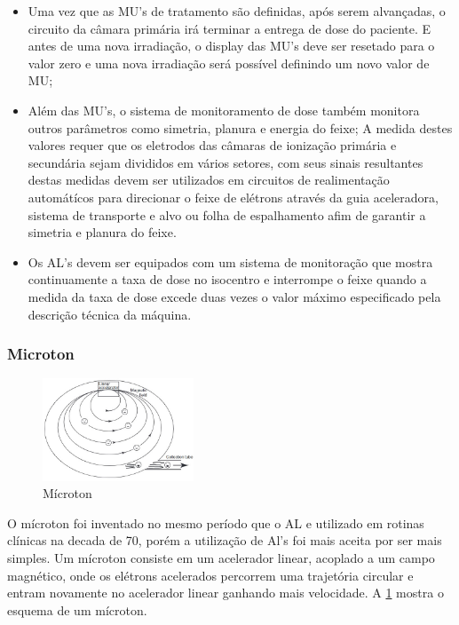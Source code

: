 \documentclass[11pt,a4paper]{article}
\begin{document}
\begin{itemize}
		\item Uma vez que as MU's de tratamento são definidas, após serem alvançadas, o circuito da câmara primária irá terminar a entrega de dose do paciente. E antes de uma nova irradiação, o display das MU's deve ser resetado para o valor zero e uma nova irradiação será possível definindo um novo valor de MU;
		
		\item Além das MU's, o sistema de monitoramento de dose também monitora outros parâmetros como simetria, planura e energia do feixe; A medida destes valores requer que os eletrodos das câmaras de ionização primária e secundária sejam divididos em vários setores, com seus sinais resultantes destas medidas devem ser utilizados em circuitos de realimentação automátícos para direcionar o feixe de elétrons através da guia aceleradora, sistema de transporte e alvo ou folha de espalhamento afim de garantir a simetria e planura do feixe.
		
		\item Os AL's devem ser equipados com um sistema de monitoração que mostra continuamente a taxa de dose no isocentro e interrompe o feixe quando a medida da taxa de dose excede duas vezes o valor máximo especificado pela descrição técnica da máquina.
	\end{itemize}
            
\subsubsection*{Microton}

                \begin{figure}
                    \centering
                    \includegraphics[width=0.4\textwidth]{Imagens/microton.jpg}
                    \caption{Mícroton}
                    \label{fig:microton}
                \end{figure}
                    
    O mícroton foi inventado no mesmo período que o AL e utilizado em rotinas clínicas na decada de 70, porém a utilização de Al's foi mais aceita por ser mais simples. Um mícroton consiste em um acelerador linear, acoplado a um campo magnético,  onde os elétrons acelerados percorrem uma trajetória circular e entram novamente no acelerador linear ganhando mais velocidade. A \ref{fig:microton} mostra o esquema de um mícroton. 
\end{document}
